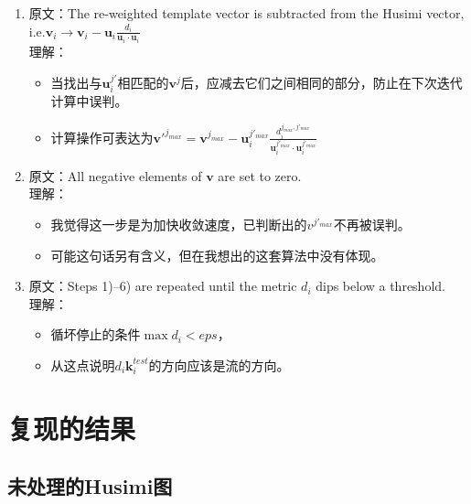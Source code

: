 \documentclass[UTF8]{beamer}
\begin{document}
\begin{frame}[allowframebreaks]
\begin{enumerate}
%
    \item 原文：The re-weighted template vector is subtracted from the \textcolor{red!80}{Husimi vector}, i.e.$\mathbf{v}_i \rightarrow \mathbf{v}_i - \mathbf{u}_i\frac{d_i}{\mathbf{u}_i\cdot\mathbf{u}_i}$\\
          理解：
            \begin{itemize}
                \item 当找出与$\mathbf{u}_{i}^{j'}$相匹配的$\mathbf{v}^{j}$后，应减去它们之间相同的部分，防止在下次迭代计算中误判。
                \item 计算操作可表达为$\mathbf{v'}^{j_{max}}=\mathbf{v}^{j_{max}}-\mathbf{u}_{i}^{j'_{max}}\frac{d_{i}^{j_{max},j'_{max}}}{\mathbf{u}_{i}^{j'_{max}}\cdot\mathbf{u}_{i}^{j'_{max}}}$
            \end{itemize}
    \item 原文：All negative elements of $\mathbf{v}$ are set to zero.\\
          理解：
            \begin{itemize}
                \item 我觉得这一步是为加快收敛速度，已判断出的$v^{j'_{max}}$不再被误判。
                \item 可能这句话另有含义，但在我想出的这套算法中没有体现。
            \end{itemize}
    \item 原文：Steps 1)–6) are repeated until the metric $d_i$ dips
            below a threshold.\\
          理解：
            \begin{itemize}
                \item 循坏停止的条件$\max{d_i}<eps$，
                \item 从这点说明$d_i\mathbf{k}_{i}^{test}$的方向应该是流的方向。
            \end{itemize}
    \end{enumerate}
\end{frame}
%
\section{复现的结果}
\subsection{未处理的Husimi图}
\end{document}
